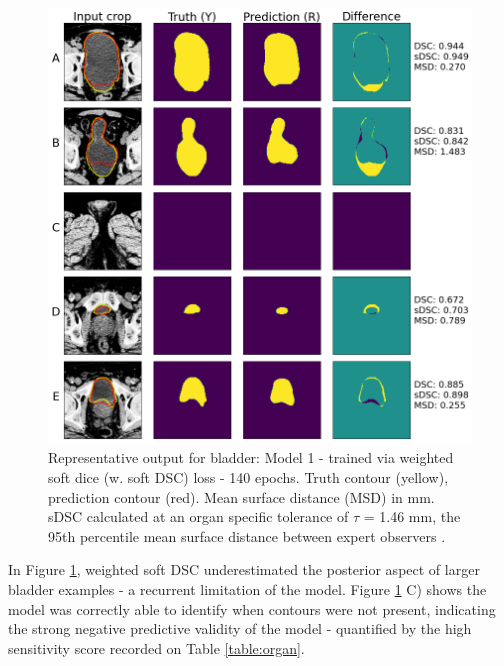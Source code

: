 \begin{figure}[H]
	\begin{center}
		\includegraphics[width=1.0\textwidth]{figures/prostate_bladder}
		\caption{Representative output for bladder: Model 1 - trained via weighted soft dice (w. soft DSC) loss - 140 epochs. Truth contour (yellow), prediction contour (red). Mean surface distance (MSD) in mm. sDSC \cite{Nikolov_2018} calculated at an organ specific tolerance of $\tau$ = 1.46 mm, the 95th percentile mean surface distance between expert observers \cite{Roach_2019}.}
		\label{fig:prostate_bladder}
	\end{center}
\end{figure}

In Figure \ref{fig:prostate_bladder}, weighted soft DSC underestimated the posterior aspect of larger bladder examples - a recurrent limitation of the model. Figure \ref{fig:prostate_bladder} C) shows the model was correctly able to identify when contours were not present, indicating the strong negative predictive validity of the model - quantified by the high sensitivity score recorded on Table \ref{table:organ}.

